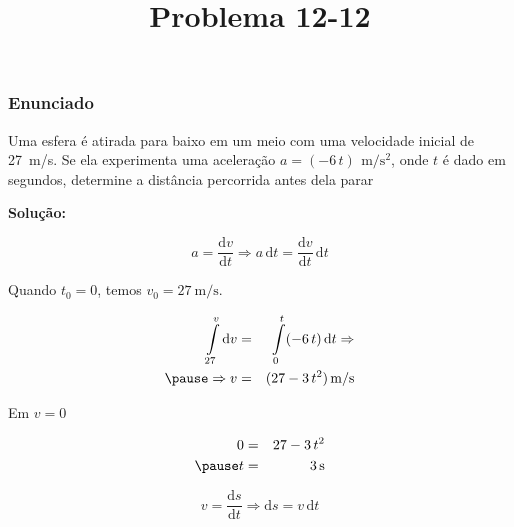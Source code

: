 \documentclass[12pt]{beamer}
\begin{document}
	\title{Problema 12-12}
\begin{frame}[plain]
	\maketitle
\end{frame}

\begin{frame}
	\frametitle{Enunciado}
	
	\begin{minipage}{.7\linewidth}
		Uma esfera é atirada para baixo em um meio com uma velocidade inicial de \SI{27}{\meter/\second}. Se ela experimenta uma aceleração $a=(-6\,t)\,\SI{}{\meter/\second^{2}}$, onde $t$ é dado em segundos, determine a distância percorrida antes dela parar \pause
	\end{minipage}
	\begin{minipage}{.2\linewidth}
		\begin{center}
		\end{center}
	\end{minipage}
	
	\vspace{.2cm}
	
	\pause\textbf{Solução:}\pause
	
	\begin{equation}
		a=\dfrac{\text{d}v}{\text{d}t} \Rightarrow a\,\text{d}t=\dfrac{\text{d}v}{\text{d}t}\,\text{d}t
	\end{equation}\pause
\end{frame}

\begin{frame}
	Quando $t_{0}=0$, temos $v_{0}=\SI{27}{\meter/\second}$.\pause
	
	\begin{eqnarray}
		\int\limits_{27}^{v}\text{d}v&=&\int\limits_{0}^{t}(-6\,t)\,\text{d}t \Rightarrow\\\pause
		\Rightarrow v&=&(27-3\,t^{2})\,\SI{}{\meter/\second}
	\end{eqnarray}\pause
	
	Em $v=0$\pause
	
	\begin{eqnarray}
		0&=&27-3\,t^{2}\\\pause
		t&=&\SI{3}{\second}
	\end{eqnarray}\pause

	\begin{equation}
		v=\dfrac{\text{d}s}{\text{d}t} \Rightarrow \text{d}s=v\,\text{d}t
	\end{equation}\pause
\end{frame}
\end{document}
